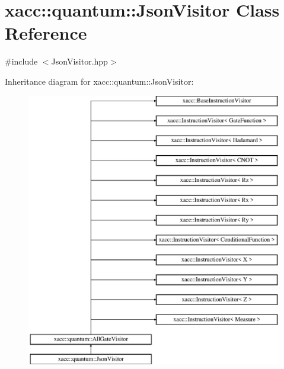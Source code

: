 \hypertarget{a00188}{}\section{xacc\+:\+:quantum\+:\+:Json\+Visitor Class Reference}
\label{a00188}


{\ttfamily \#include $<$Json\+Visitor.\+hpp$>$}

Inheritance diagram for xacc\+:\+:quantum\+:\+:Json\+Visitor\+:\begin{figure}[H]
\begin{center}
\leavevmode
\includegraphics[height=12.000000cm]{a00188}
\end{center}
\end{figure}
